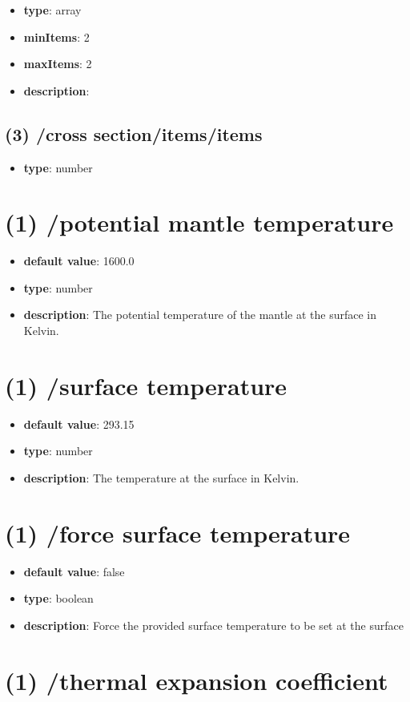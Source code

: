 \begin{itemize}[leftmargin=2em]\item {\bf type}: array
\item {\bf minItems}: 2
\item {\bf maxItems}: 2
\item {\bf description}: 
\end{itemize}\subsection{(3) /cross section/items/items}
\begin{itemize}[leftmargin=3em]\item {\bf type}: number
\end{itemize}\section{(1) /potential mantle temperature}
\begin{itemize}[leftmargin=1em]\item {\bf default value}: 1600.0
\item {\bf type}: number
\item {\bf description}: The potential temperature of the mantle at the surface in Kelvin.
\end{itemize}\section{(1) /surface temperature}
\begin{itemize}[leftmargin=1em]\item {\bf default value}: 293.15
\item {\bf type}: number
\item {\bf description}: The temperature at the surface in Kelvin.
\end{itemize}\section{(1) /force surface temperature}
\begin{itemize}[leftmargin=1em]\item {\bf default value}: false
\item {\bf type}: boolean
\item {\bf description}: Force the provided surface temperature to be set at the surface
\end{itemize}\section{(1) /thermal expansion coefficient}
